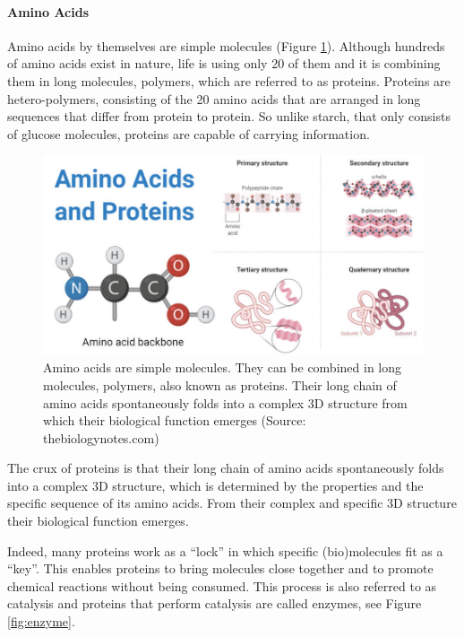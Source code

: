 \documentclass[
  11pt,
]{book}
\begin{document}
\hypertarget{amino-acids}{%
\paragraph{Amino Acids}\label{amino-acids}}

Amino acids by themselves are simple molecules (Figure \ref{fig:aminoAcids}).
Although hundreds of amino acids exist in nature, life is using only 20 of them and it is combining them in long molecules, polymers, which are referred to as proteins.
Proteins are hetero-polymers, consisting of the 20 amino acids that are arranged in long sequences that differ from protein to protein.
So unlike starch, that only consists of glucose molecules, proteins are capable of carrying information.



\begin{figure}

{\centering \includegraphics[width=1\linewidth]{./figs/Amino-acids-and-Proteins} 

}

\caption{Amino acids are simple molecules. They can be combined in long molecules, polymers, also known as proteins. Their long chain of amino acids spontaneously folds into a complex 3D structure from which their biological function emerges (Source: thebiologynotes.com)}\label{fig:aminoAcids}
\end{figure}

The crux of proteins is that their long chain of amino acids spontaneously folds into a complex 3D structure, which is determined by the properties and the specific sequence of its amino acids. From their complex and specific 3D structure their biological function emerges.

Indeed, many proteins work as a ``lock'' in which specific (bio)molecules fit as a ``key''. This enables proteins to bring molecules close together and to promote chemical reactions without being consumed. This process is also referred to as catalysis and proteins that perform catalysis are called enzymes, see Figure \ref{fig:enzyme}.
\end{document}
